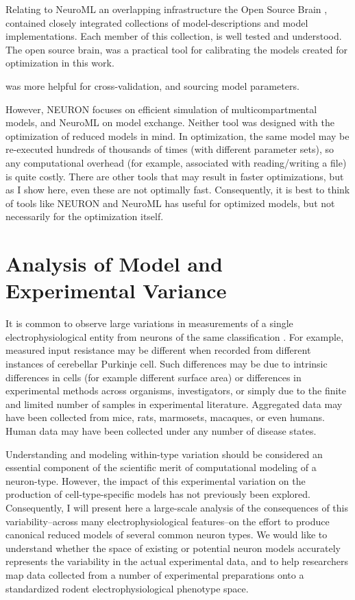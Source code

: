 Relating to NeuroML an overlapping infrastructure the Open Source Brain \cite{gleeson2019open}, contained closely integrated collections of model-descriptions and model implementations. Each member of this collection, is well tested and understood. The open source brain, was a practical tool for calibrating the models created for optimization in this work.


was more helpful for cross-validation, and sourcing model parameters.

However, NEURON focuses on efficient simulation of multicompartmental models, and NeuroML on model exchange. 
Neither tool was designed with the optimization of reduced models in mind.
In optimization, the same model may be re-executed hundreds of thousands of times (with different parameter sets), so any computational overhead (for example, associated with reading/writing a file) is quite costly.  
There are other tools that may result in faster optimizations, but as I show here, even these are not optimally fast.
Consequently, it is best to think of tools like NEURON and NeuroML has useful for optimized models, but not necessarily for the optimization itself.  

\section{Analysis of Model and Experimental Variance}
It is common to observe large variations in measurements of a single electrophysiological entity from neurons of the same classification \cite{tripathy2014neuroelectro}.
For example, measured input resistance may be different when recorded from different instances of cerebellar Purkinje cell.
Such differences may be due to intrinsic differences in cells (for example different surface area) or differences in experimental methods across organisms, investigators, or simply due to the finite and limited number of samples in experimental literature.  
Aggregated data may have been collected from mice, rats, marmosets, macaques, or even humans.
Human data may have been collected under any number of disease states.

Understanding and modeling within-type variation should be considered an essential component of the scientific merit of computational modeling of a neuron-type.
However, the impact of this experimental variation on the production of cell-type-specific models has not previously been explored.
Consequently, I will present here a large-scale analysis of the consequences of this variability--across many electrophysiological features--on the effort to produce canonical reduced models of several common neuron types.
We would like to understand whether the space of existing or potential neuron models accurately represents the variability in the actual experimental data, and to help researchers map data collected from a number of experimental preparations onto a standardized rodent electrophysiological phenotype space.

